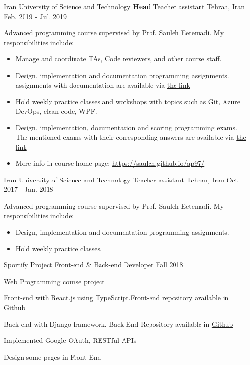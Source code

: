 \begin{cventries}
  \cventry
  {Iran University of Science and Technology} %
  {\textbf{Head} Teacher assistant} %
  {Tehran, Iran} %
  {Feb. 2019 - Jul. 2019} %
  {
    Advanced programming course supervised by \textcolor{awesome-red}{\href{https://sauleh.github.io/ap97/}{Prof. Sauleh Eetemadi}}. My responsibilities include:
    \begin{itemize}
      \item 
      Manage and coordinate TAs, Code reviewers, and other course staff.
      \item
      Design, implementation and documentation programming assignments. assignments with documentation are available via \textcolor{awesome-red}{\href{https://sauleh.github.io/ap97/assignments/}{the link}}
      \item
      Hold weekly practice classes and workshops with topics such as Git, Azure DevOps, clean code, WPF.
      \item
      Design, implementation, documentation and scoring programming exams. The mentioned exams with their corresponding answers are available via \textcolor{awesome-red}{\href{https://sauleh.github.io/ap97/assignments/}{the link}}
      \item
      More info in course home page: \textcolor{awesome-red}{\href{https://sauleh.github.io/ap97/}{https://sauleh.github.io/ap97/}}
    \end{itemize}
  }

  \cventry
  {Iran University of Science and Technology} %
  {Teacher assistant} %
  {Tehran, Iran} %
  {Oct. 2017 - Jan. 2018} %
  {
     Advanced programming course supervised by \textcolor{awesome-red}{\href{https://sauleh.github.io/ap97/}{Prof. Sauleh Eetemadi}}. My responsibilities include:
     \begin{itemize}
      \item
      Design, implementation and documentation programming assignments.
      \item
      Hold weekly practice classes.
    \end{itemize}
  }

  \cventry
  {Sportify Project} %
  {Front-end \& Back-end Developer} %
  {} %
  {Fall 2018} %
  {
    \begin{cvitems} %
      \item {Web Programming course project}
      \item {Front-end with React.js using TypeScript.Front-end repository available in \textcolor{awesome-red}{\href{https://github.com/ali4heydari/sportify-frontend}{Github}}}
      \item {Back-end with Django framework. Back-End Repository available in \textcolor{awesome-red}{\href{https://github.com/ali4heydari/sportify-backend}{Github}}}
      \item {Implemented Google OAuth, RESTful APIs}
      \item {Design some pages in Front-End}
    \end{cvitems}
  }



\end{cventries}
